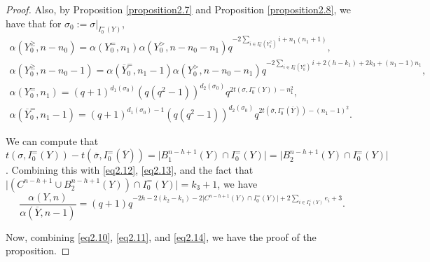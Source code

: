 \documentclass[11pt,oneside]{amsart}
\theoremstyle{plain}
\theoremstyle{definition}
\theoremstyle{remark}
\numberwithin{equation}{section}
\begin{document}
\begin{proof}
		Also, by Proposition \ref{proposition2.7} and Proposition \ref{proposition2.8}, we have that for $\sigma_0:=\sigma\vert_{I_0^=(Y)}$,
		\begin{equation}\label{eq2.13}
			\begin{array}{l}
				\alpha(Y_0^{\geq},n-n_0)=\alpha(Y_0^{=},n_1)\alpha(Y_0^{>},n-n_0-n_1)q^{-2\sum_{i \in I_0^{=}(Y^{\geq}_0)} i +n_1(n_1+1)},\\
				\alpha(Y_0^{\geq},n-n_0-1)=\alpha(\overline{Y}_0^{=},n_1-1)\alpha(Y_0^{>},n-n_0-n_1)q^{-2\sum_{i \in I_0^{=}(Y^{\geq}_0)} i +2(h-k_1)+2k_3+(n_1-1)n_1},	\\
				\alpha(Y_0^{=},n_1)=(q+1)^{d_1(\sigma_0)}(q(q^2-1))^{d_2(\sigma_0)}q^{2t(\sigma,I_0^{=}(Y))-n_1^2},\\
				\alpha(\overline{Y}_0^{=},n_1-1)=(q+1)^{d_1(\sigma_0)-1}(q(q^2-1))^{d_2(\sigma_0)}q^{2t(\overline{\sigma},I_0^=(\overline{Y}))-(n_1-1)^2}.
			\end{array}
		\end{equation}
		
		We can compute that $t(\sigma,I_0^{=}(Y))-t(\overline{\sigma},I_0^=(\overline{Y}))=\vert B_1^{n-h+1}(Y) \cap I_0^=(Y)\vert=\vert B_2^{n-h+1}(Y) \cap I_0^=(Y)\vert $. Combining this with \eqref{eq2.12}, \eqref{eq2.13}, and the fact that $\vert (C^{n-h+1}\cup B_2^{n-h+1}(Y)) \cap I_0^=(Y) \vert= k_3+1$, we have
		\begin{equation}\label{eq2.14}
			\dfrac{\alpha(Y,n)}{\alpha(\overline{Y},n-1)}=(q+1)q^{-2h-2(k_2-k_1)-2\vert C^{n-h+1}(Y) \cap I_0^=(Y) \vert+2 \sum_{i \in I_0^{<}(Y)} e_i +3}.
		\end{equation}
		
		Now, combining \eqref{eq2.10}, \eqref{eq2.11}, and \eqref{eq2.14}, we have the proof of the proposition.
	\end{proof}
	
\end{document}
